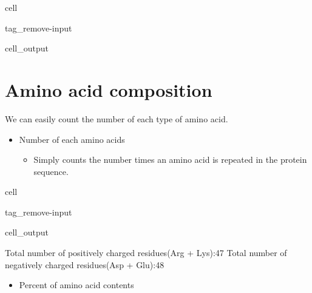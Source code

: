 \documentclass[letterpaper,10pt,english]{jupyterBook}
\begin{document}
\begin{sphinxuseclass}{cell}
\begin{sphinxuseclass}{tag_remove-input}\begin{sphinxVerbatimOutput}

\begin{sphinxuseclass}{cell_output}
\noindent{}

\end{sphinxuseclass}\end{sphinxVerbatimOutput}

\end{sphinxuseclass}
\end{sphinxuseclass}

\section{Amino acid composition}
\label{\detokenize{ipynb/chapter1:amino-acid-composition}}
\sphinxAtStartPar
We can easily count the number of each type of amino acid.
\begin{itemize}
\item {} 
\sphinxAtStartPar
Number of each amino acids
\begin{itemize}
\item {} 
\sphinxAtStartPar
Simply counts the number times an amino acid is repeated in the protein sequence.

\end{itemize}

\end{itemize}

\begin{sphinxuseclass}{cell}
\begin{sphinxuseclass}{tag_remove-input}\begin{sphinxVerbatimOutput}

\begin{sphinxuseclass}{cell_output}
\begin{sphinxVerbatim}[commandchars=\\\{\}]
Total number of positively charged residues(Arg + Lys):\PYGZhy{}\PYGZhy{}\PYGZhy{}\PYGZhy{}\PYGZhy{}\PYGZhy{}\PYGZhy{}\PYGZhy{}47
Total number of negatively charged residues(Asp + Glu):\PYGZhy{}\PYGZhy{}\PYGZhy{}\PYGZhy{}\PYGZhy{}\PYGZhy{}\PYGZhy{}\PYGZhy{}48
\end{sphinxVerbatim}

\noindent{}

\end{sphinxuseclass}\end{sphinxVerbatimOutput}

\end{sphinxuseclass}
\end{sphinxuseclass}\begin{itemize}
\item {} 
\sphinxAtStartPar
Percent of amino acid contents

\end{itemize}
\end{document}
